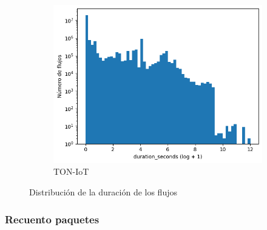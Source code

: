 \begin{figure}[H]
\begin{subfigure}[b]{0.32\textwidth}
        \centering
        \includegraphics[width=\linewidth]{media/packet_pincer_toniot/duration_seconds_log_x_log_y.png}
        \caption{TON-IoT}
    \end{subfigure}
       \caption{Distribución de la duración de los flujos}
       \label{fig:packet_pincer_duration}
\end{figure}

\subsubsection{Recuento paquetes}


